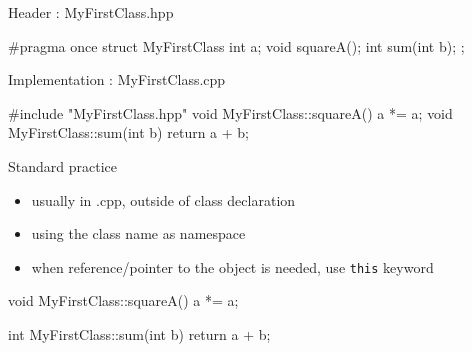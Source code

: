 \begin{frame}[fragile]
  \begin{block}{Header : MyFirstClass.hpp}
    \begin{cppcode*}{}
      #pragma once
      struct MyFirstClass {
        int a;
        void squareA();
        int sum(int b);
      };
    \end{cppcode*}
  \end{block}
  \begin{block}{Implementation : MyFirstClass.cpp}
    \begin{cppcode*}{}
      #include "MyFirstClass.hpp"
      void MyFirstClass::squareA() {
        a *= a;
      }
      void MyFirstClass::sum(int b) {
        return a + b;
      }
    \end{cppcode*}
  \end{block}
\end{frame}

\begin{frame}[fragile]
  \begin{block}{Standard practice}
    \begin{itemize}
    \item usually in .cpp, outside of class declaration
    \item using the class name as namespace
    \item when reference/pointer to the object is needed, use \texttt{this} keyword
    \end{itemize}
  \end{block}
  \begin{cppcode}
    void MyFirstClass::squareA() {
      a *= a;
    }

    int MyFirstClass::sum(int b) {
      return a + b;
    }
  \end{cppcode}
\end{frame}

